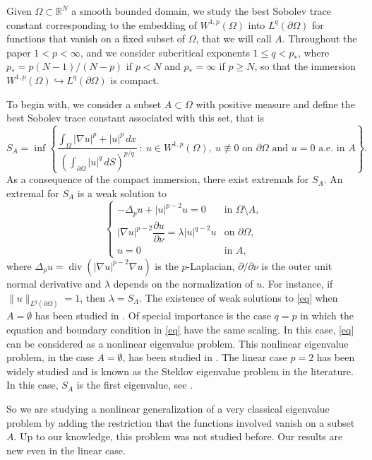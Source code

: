 \documentclass[11pt]{amsart}
\theoremstyle{remark}
\numberwithin{equation}{section}
\newcommand{\R}{\mathbb{R}}
\begin{document}
\medskip

Given $\Omega\subset\R^N$ a smooth bounded domain, we study the best Sobolev trace constant corresponding to the embedding of $W^{1,p}(\Omega)$ into $L^q(\partial\Omega)$ for functions that vanish on a fixed subset of $\Omega$, that we will call $A$. Throughout the paper $1<p<\infty$, and we consider subcritical exponents $1\le q<p_*$, where $p_*=p(N-1)/(N-p)$ if $p<N$ and $p_*=\infty$ if $p\ge N$, so that the immersion $W^{1,p}(\Omega)\hookrightarrow L^q(\partial\Omega)$ is compact.

To begin with, we consider a subset $A\subset\Omega$ with positive measure and define the best Sobolev trace constant associated with this set, that is
\begin{equation}\label{SA}
S_A=\inf\left\{\frac{\int_\Omega |\nabla u|^p+|u|^p\,dx}{\left(\int_{\partial\Omega}|u|^q\,dS\right)^{p/q}} \ :\ u\in W^{1,p}(\Omega),\ u\not\equiv0 \text{ on }\partial\Omega \text{ and } u=0 \text{ a.e. in } A\right\}.
\end{equation}
As a consequence of the compact immersion, there exist extremals for $S_A$. An extremal for $S_A$ is a weak solution to
\begin{equation}\label{eq}
\begin{cases}
-\Delta_p u+|u|^{p-2}u=0 & \text{in } \Omega\setminus A,\\[2pt]
|\nabla u|^{p-2}\dfrac{\partial u}{\partial\nu}=\lambda|u|^{q-2}u & \text{on }\partial\Omega,\\[4pt]
u=0 & \text{in } A,
\end{cases}
\end{equation}
where $\Delta_pu=\operatorname{div}(|\nabla u|^{p-2}\nabla u)$ is the $p$-Laplacian, $\partial/\partial\nu$ is the outer unit normal derivative and $\lambda$ depends on the normalization of $u$. For instance, if $\|u\|_{L^q(\partial\Omega)}=1$, then $\lambda=S_A$. The existence of weak solutions to \eqref{eq} when $A=\emptyset$ has been studied in \cite{FBR1}. Of special importance is the case $q=p$ in which the equation and boundary condition in \eqref{eq} have the same scaling. In this case, \eqref{eq} can be considered as a nonlinear eigenvalue problem. This nonlinear eigenvalue problem, in the case $A=\emptyset$, has been studied in \cite{FBR1,MR}. The linear case $p=2$ has been widely studied and is known as the Steklov eigenvalue problem in the literature. In this case, $S_A$ is the first eigenvalue, see \cite{St}.

So we are studying a nonlinear generalization of a very classical eigenvalue problem by adding the restriction that the functions involved vanish on a subset $A$. Up to our knowledge, this problem was not studied before. Our results are new even in the linear case.
\end{document}
